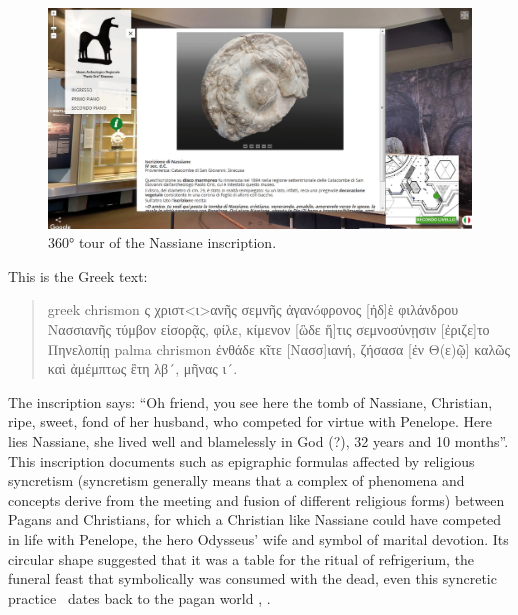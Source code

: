\documentclass[amsthm,ebook]{saparticle}
\begin{document}
\begin{figure}[!bp]
\centering
 \includegraphics[width=\columnwidth]{EAGLE2016BONACINIPilotprojectatPaoloOrsiMuseum-img005.jpg}
\caption{360° tour of the Nassiane inscription.}
\label{fig:5}
\end{figure}


This is the Greek text: 

\begin{quotation}


\begin{otherlanguage*}{greek}
chrismon ς χριστ<ι>ανῆς σεμνῆς ἀγανóφρονος [ἠδ]ὲ φιλάνδρου Nασσιανῆς τύμβον εἰσορᾷς, φίλε, κίμενον [ὣδε ἥ]τις σεμνοσύνῃσιν [ἐριζε]το Πηνελοπίῃ palma chrismon ἐνθάδε κῖτε [Nασσ]ιανή, ζήσασα [ἐν Θ(ε)ῷ] καλῶς καὶ ἀμέμπτως ἒτη λβ´, μῆνας ι´.
\end{otherlanguage*}

\end{quotation}



The inscription says: ``Oh friend, you see here the tomb of Nassiane, Christian, ripe, sweet, fond of her husband, who
competed for virtue with Penelope. Here lies Nassiane, she lived well and blamelessly in God (?), 32 years and 10
months''. This inscription documents such as epigraphic formulas affected by religious syncretism (syncretism generally
means that a complex of phenomena and concepts derive from the meeting and fusion of different religious forms) between
Pagans and Christians, for which a Christian like Nassiane could have competed in life with Penelope, the hero
Odysseus’ wife and symbol of marital devotion. Its circular shape suggested that it was a table for the ritual of
refrigerium, the funeral feast that symbolically was consumed with the dead, even this syncretic practice \ dates back
to the pagan world \citep{Sgarlata2013}, \citep{Scandurra2014}.
\end{document}
